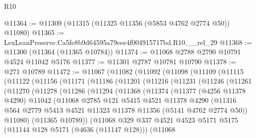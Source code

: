 \begin{lexlean}{R10}
\begin{coremodule}
@11364 := @11309 (@11315 (@11325 @11356 (@5853 @4762 @2774 @50)) @11080)
@11365 := LexLeanPreserve.Ca5fe8b9d64595a79eee4f004915717bd.R10.__rel_29
@11368 := @11300 (@11364 (@11365 @10784))
@11374 := @11068 @2788 @2790 @10791 @4524 @11042 @5176
@11377 := @11301 @2787 @10781 @10790
@11378 := @271 @10789
@11472 := @11067
    (@11082
      (@11092
        (@11098
          (@11109
            (@11115
              (@11122
                (@11156
                  (@11171
                    (@11186
                      (@11201
                        (@11216
                          (@11231
                            (@11246
                              (@11261
                                (@11270
                                  (@11278
                                    (@11286
                                      (@11294
                                        (@11368
                                          (@11374
                                            (@11377
                                              (@4256 @11378 @4290)
                                              @11042
                                              (@11068
                                                @2785
                                                @121
                                                @5415
                                                @4521
                                                @11378
                                                @4290
                                                (@11316
                                                  @564
                                                  @2779
                                                  @5413
                                                  @4521
                                                  @11323
                                                  @11378
                                                  @11356
                                                  (@5141 @4762 @2774 @50))
                                                @11080)
                                              (@11365 @10789))
                                            (@11068
                                              @329
                                              @337
                                              @4521
                                              @4523
                                              @5171
                                              @5175
                                              (@11144 @128 @5171 (@4636 (@11147 @128)))
                                              (@11068

\end{coremodule}
\end{lexlean}
